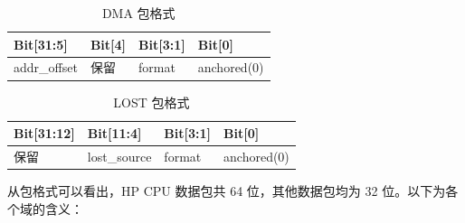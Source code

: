 \documentclass[main\_\_CN.tex]{subfiles}
\begin{document}
    \begin{longtable}[c]{|L{2cm}|L{2cm}|L{2cm}|L{2cm}|}
    \caption{DMA 包格式}\label{tab:dbgassist-dma-package}
    \\\hline
    \textbf{Bit[31:5]} & \textbf{Bit[4]} & \textbf{Bit[3:1]} & \textbf{Bit[0]} \\\hline
    addr\_offset & 保留 & format & anchored(0) \\\hline
    \end{longtable}

    \begin{longtable}[c]{|L{2cm}|L{2cm}|L{2cm}|L{2cm}|}
    \caption{LOST 包格式}\label{tab:dbgassist-lost-package}
    \\\hline
    \textbf{Bit[31:12]} & \textbf{Bit[11:4]} & \textbf{Bit[3:1]} & \textbf{Bit[0]} \\\hline
    保留 & lost\_source & format & anchored(0) \\\hline
    \end{longtable}

从包格式可以看出，HP CPU 数据包共 64 位，其他数据包均为 32 位。以下为各个域的含义：
\end{document}
